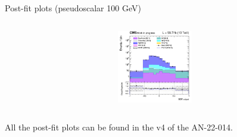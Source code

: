 \documentclass[8pt]{beamer}
\begin{document}
\begin{frame}{Post-fit plots (pseudoscalar 100 GeV)}
\begin{columns}
\begin{column}{0.33\textwidth}
\begin{center}
     			\includegraphics[width=1.0\textwidth, height=90pt]{figs/postfits/2018/log_cratio_TTbar_topCR_ll_BDT_ttDM100_TTbar_BDT_output_pseudoscalar100_customBinsAttempt7.png}
    		\end{center}		
		\end{column}
\end{columns} \vfill

All the post-fit plots can be found in the v4 of the AN-22-014. \vfill
\end{frame}
\end{document}
